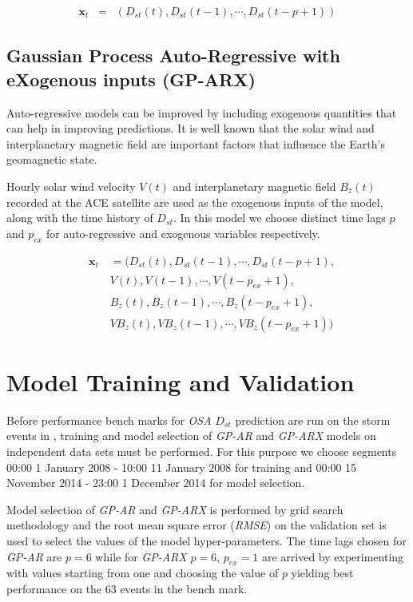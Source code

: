 \documentclass[referee,a4paper,12pt,traditabstract]{swsc}
\begin{document}
\begin{linenumbers}
\begin{eqnarray*}
    \mathbf{x}_t & = & \left(D_{st}(t), D_{st}(t-1), \cdots , D_{st}(t-p+1)\right)
\end{eqnarray*}

\subsection{Gaussian Process Auto-Regressive with eXogenous inputs (GP-ARX)} \label{sec:gparx}

Auto-regressive models can be improved by including exogenous quantities that can help in improving predictions. It is well known that the solar wind and interplanetary magnetic field are important factors that influence the Earth's geomagnetic state.

Hourly solar wind velocity $V(t)$ and interplanetary magnetic field $B_z(t)$ recorded at the ACE satellite are used as the exogenous inputs of the model, along with the time history of $D_{st}$. In this model we choose distinct time lags $p$ and $p_{ex}$ for auto-regressive and exogenous variables respectively.
    
\begin{eqnarray*}
        & \mathbf{x}_t & = (D_{st}(t), D_{st}(t-1), \cdots , D_{st}(t-p+1), \\
        & \ \ \ \ \ & V(t), V(t-1), \cdots, V(t-p_{ex}+1),\\
        & \ \ \ \ \ & B_{z}(t), B_{z}(t-1), \cdots, B_{z}(t-p_{ex}+1),\\
        & \ \ \ \ \ & V B_{z}(t), V B_{z}(t-1), \cdots, V B_{z}(t-p_{ex}+1))
\end{eqnarray*}

\section{Model Training and Validation}

Before performance bench marks for \emph{OSA} $D_{st}$ prediction are run on the storm events in \cite{Ji2012}, training and model selection of \emph{GP-AR} and \emph{GP-ARX} models on independent data sets must be performed. For this purpose we choose segments 00:00 1 January 2008 - 10:00 11 January 2008 for training and 00:00 15 November 2014 - 23:00 1 December 2014 for model selection.

Model selection of \emph{GP-AR} and \emph{GP-ARX} is performed by grid search methodology and the root mean square error (\emph{RMSE}) on the validation set is used to select the values of the model hyper-parameters. The time lags chosen for \emph{GP-AR} are $p = 6$ while for \emph{GP-ARX} $p=6$, $p_{ex} = 1$ are arrived by experimenting with values starting from one and choosing the value of $p$ yielding best performance on the 63 events in the bench mark.   


\end{linenumbers}
\end{document}
